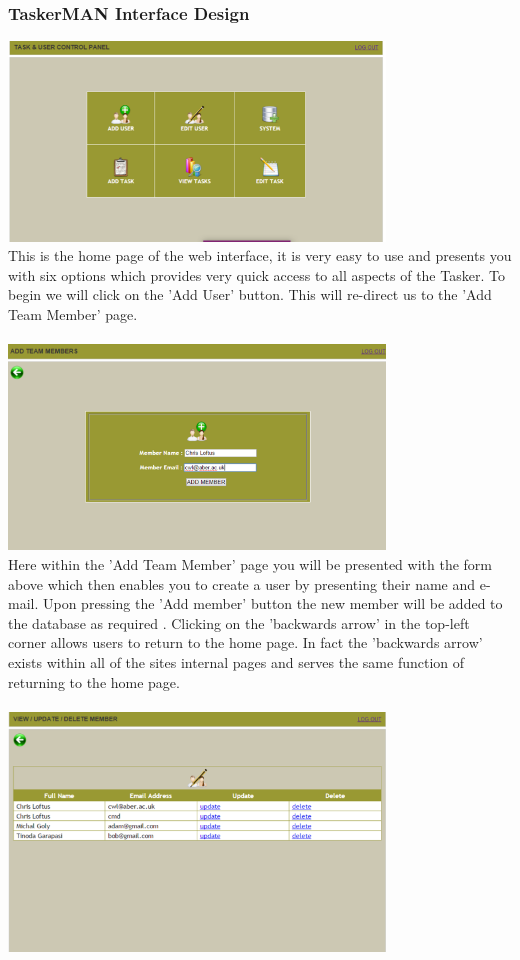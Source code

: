 \documentclass{project}
\begin{document}
\subsubsection{TaskerMAN Interface Design} 
\includegraphics[width=0.75\textwidth, center]{images/5.2/TaskerMANHomePage} \\
This is the home page of the web interface, it is very easy to use and presents you with six options which provides very quick access to all aspects of the Tasker. To begin we will click on the 'Add User' button. This will re-direct us to the 'Add Team Member' page. \\~\\
\newline
\includegraphics[width=0.75\textwidth, center]{images/5.2/TaskerMANAddUser} \\
Here within the 'Add Team Member' page you will be presented with the form above which then enables you to create a user by presenting their name and e-mail. Upon pressing the 'Add member' button the new member will be added to the database as required \cite{se.qa.rs fr3}. Clicking on the 'backwards arrow' in the top-left corner allows users to return to the home page. In fact the 'backwards arrow' exists within all of the sites internal pages and serves the same function of returning to the home page. \\~\\
\newline
\includegraphics[width=0.75\textwidth, center]{images/5.2/TaskerMANEditUser} \\
\end{document}
